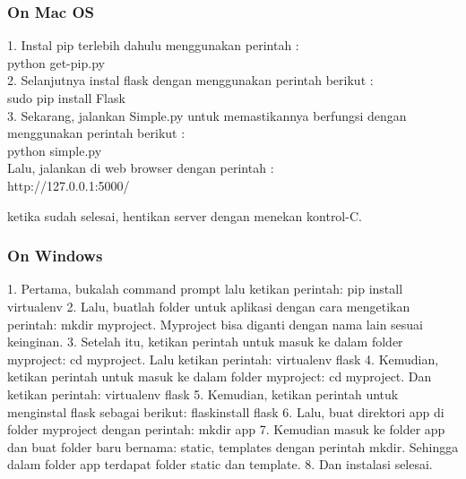 \documentclass[12pt,a4paper]{article}
\begin{document}
\subsubsection{On Mac OS}
1. Instal pip terlebih dahulu menggunakan perintah :\\
	python get-pip.py\\

2. Selanjutnya instal flask dengan menggunakan perintah berikut :\\
	sudo pip install Flask\\

3. Sekarang, jalankan Simple.py untuk memastikannya berfungsi dengan menggunakan perintah berikut :\\
	python simple.py\\

Lalu, jalankan di web browser dengan perintah :\\
http://127.0.0.1:5000/

ketika sudah selesai, hentikan server dengan menekan kontrol-C.
\subsubsection{On Windows}
1.	Pertama, bukalah command prompt lalu ketikan perintah: pip install virtualenv
2.	Lalu, buatlah folder untuk aplikasi dengan cara mengetikan perintah: mkdir myproject.
Myproject bisa diganti dengan nama lain sesuai keinginan.
3.	Setelah itu, ketikan perintah untuk masuk ke dalam folder myproject: cd myproject. Lalu ketikan perintah: virtualenv flask
4.	Kemudian, ketikan perintah untuk masuk ke dalam folder myproject: cd myproject. Dan ketikan perintah: virtualenv flask
5.	Kemudian, ketikan perintah untuk menginstal flask sebagai berikut: flask\Scripts\pip install flask
6.	Lalu, buat direktori app di folder myproject dengan perintah: mkdir app
7.	Kemudian masuk ke folder app dan buat folder baru bernama: static, templates dengan perintah mkdir. Sehingga dalam folder app terdapat folder static dan template.
8.	Dan instalasi selesai.
\end{document}
